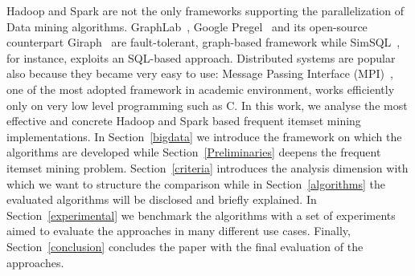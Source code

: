 Hadoop and Spark are not the only frameworks supporting the parallelization of Data mining algorithms. GraphLab~\cite{graphlab}, Google Pregel~\cite{pregel} and its open-source counterpart Giraph~\cite{giraph} are fault-tolerant, graph-based framework while SimSQL~\cite{simsql}, for instance, exploits an SQL-based approach. 
Distributed systems are popular also because they became very easy to use: Message Passing Interface (MPI)~\cite{mpi}, one of the most adopted framework in academic environment, works efficiently only on very low level programming such as C.
In this work, we analyse the most effective and concrete Hadoop and Spark based frequent itemset mining implementations. In Section~\ref{bigdata} we introduce the framework on which the algorithms are developed while Section~\ref{Preliminaries} deepens the frequent itemset mining problem. Section~\ref{criteria} introduces the analysis dimension with which we want to structure the comparison while in Section~\ref{algorithms} the evaluated algorithms will be disclosed and briefly explained. In Section~\ref{experimental} we benchmark the algorithms with a set of experiments aimed to evaluate the approaches in many different use cases. Finally, Section~\ref{conclusion} concludes the paper with the final evaluation of the approaches.